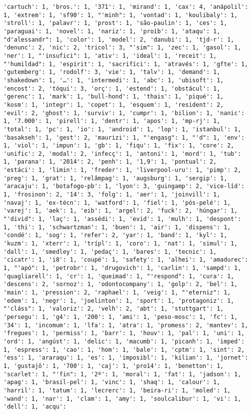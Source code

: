\documentclass[11pt]{article}
\begin{document}
\begin{Verbatim}[commandchars=\\\{\}]
'cartuch': 1, 'bros.': 1, '371': 1, 'mirand': 1, 'cax': 4, 'anápolil': 1, 'extrem': 1, 'sf90': 1, "'minh": 1, 'vontad': 1, 'koulibaly': 1, 'stroll': 1, 'palavr': 1, 'prost': 1, 'são-paulin': 1, 'ces': 1, 'paraguai': 1, 'novel': 1, 'nariz': 1, 'proíb': 1, 'ataqu': 1, "d'alessandr": 1, 'color': 1, 'model': 2, 'danubi': 1, 'tjd-r': 1, 'denunc': 2, 'nic': 2, 'tricol': 3, "'sim": 1, 'zec': 1, 'gasol': 1, 'ner': 1, "'insufici": 1, 'ativ': 1, 'ideal': 1, 'receit': 1, "'humildad": 1, 'espírit': 1, 'sacrifíci': 1, 'através': 1, 'gfte': 1, 'gutemberg': 1, 'rodolf': 3, 'vie': 1, 'talv': 1, 'demand': 1, 'shakedown': 1, '…': 1, 'intermedi': 1, 'abc': 1, 'ubisoft': 1, 'encost': 2, 'tóqui': 3, 'orç': 1, 'estend': 1, 'obstácul': 1, 'gerenc': 1, 'mark': 1, 'bull-hond': 1, 'thais': 1, 'piqué': 1, 'kosm': 1, 'integr': 1, 'copet': 1, 'esquem': 1, 'resident': 2, 'evil': 2, 'ghost': 1, 'surviv': 1, 'cumpr': 1, 'bilion': 1, 'nanic': 1, '7.000': 1, 'pirell': 1, 'dentr': 1, 'apos': 1, 'mp-rj': 1, 'total': 1, 'pc': 1, 'io': 1, 'android': 1, 'lop': 1, 'istanbul': 1, 'basakseh': 1, 'gest': 2, 'maurizi': 1, "'engasg": 1, "'d": 1, 'env': 1, 'viol': 1, 'impun': 1, 'gb': 1, 'fiqu': 1, 'fix': 1, 'core': 2, 'unific': 2, 'modal': 2, 'infecç': 1, 'antoni': 1, 'mord': 1, 'tub': 1, 'parana': 1, '2014': 2, 'penh': 1, '1,9': 1, 'pontual': 2, 'estáci': 1, 'limin': 1, 'freder': 1, 'liverpool-uru': 1, 'pimp': 2, 'preg': 1, 'grat': 1, 'relâmpag': 1, 'augsburg': 1, 'sergip': 1, 'aracaju': 1, 'botafogo-pb': 1, 'lyon': 3, 'guingamp': 2, 'vice-líd': 1, 'frosinon': 2, '14': 3, 'folg': 1, 'aer': 1, 'joinvill': 1, 'navaj': 1, 'ex-técn': 1, 'watford': 1, 'fiel': 1, 'pós-pelé': 1, 'varej': 1, 'aek': 1, 'eib': 1, 'argel': 2, 'fuck': 2, 'húngar': 1, "'divid": 1, 'laç': 1, 'assédi': 1, 'evid': 1, 'mulh': 1, 'despont': 1, 'thi': 1, 'schwartzman': 1, 'buen': 1, 'air': 1, 'dispens': 1, 'condé': 1, 'sog': 1, 'refer': 2, 'yar': 1, 'band': 1, 'kyl': 1, 'kuzm': 1, 'xterr': 1, 'trípl': 1, 'coro': 1, 'nat': 1, 'simul': 1, 'dall': 1, 'smedley': 1, 'pedaç': 1, 'bares': 1, 'tecnic': 1, 'cicatr': 1, 'i8': 1, 'coupé': 1, 'safety': 1, 'alhei': 1, 'amadurec': 1, "'apó": 1, 'petrobr': 1, 'drugovich': 1, 'carlin': 1, 'sampd': 1, 'quagliarell': 1, 'cr': 1, 'queimad': 1, "'respond": 1, 'cura': 1, 'descens': 2, 'sornoz': 1, 'odontocompany': 1, 'golp': 2, 'bel': 1, 'main': 1, 'pression': 2, 'raphael': 1, 'veig': 1, "'eterniz": 1, 'edem': 1, 'negr': 1, 'joelinton': 1, 'sport': 1, 'protagoniz': 1, "'cláss": 1, 'valoriz': 2, 'velh': 2, 'abt': 1, 'stuttgart': 1, 'persegu': 1, 'g4': 1, '200': 1, 'ami': 1, 'peso-mosc': 1, 'fc': 1, '34': 1, 'incomum': 1, 'lfa': 1, 'atra': 1, 'promess': 2, 'mantev': 1, 'fregues': 1, 'permiss': 1, 'barr': 1, 'houv': 1, 'pal': 1, 'uni': 1, 'ord': 1, 'angúst': 1, 'delic': 1, 'macumb': 1, 'picanh': 1, 'imped': 1, 'espress': 1, 'cao': 1, 'hom': 1, 'bale': 1, 'cptm': 1, 'sint': 2, 'ess': 1, 'araraqu': 1, 'es': 1, 'imposibl': 1, 'kilian': 1, 'jornet': 1, 'gustajô': 1, '700': 1, 'caj': 1, 'pro14': 1, 'benetton': 1, 'scarlet': 1, "'fin": 1, '2º': 1, 'moral': 1, 'fat': 1, 'jadson': 1, 'apag': 1, 'brasil-pel': 1, 'vinc': 1, 'shaq': 1, 'calour': 1, 'harril': 1, 'tatum': 1, 'lecrerc': 1, 'beira-ri': 1, 'moled': 1, 'wand': 1, 'nar': 1, 'clam': 1, 'amy': 1, 'soulcalibur': 1, 'vi': 1, 'dell': 1, 'acqu': 
\end{Verbatim}
\end{document}
